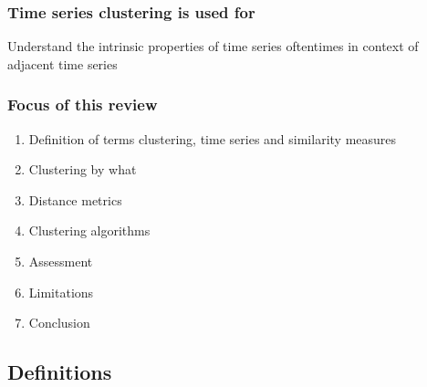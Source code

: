 \documentclass[11pt]{article}
\begin{document}
\subsubsection*{Time series clustering is used for}
\label{sec:org438f867}
Understand the intrinsic properties of time series oftentimes in context of adjacent time series
\subsubsection*{Focus of this review}
\label{sec:orgac5424e}
\begin{enumerate}
\item Definition  of terms clustering, time series and similarity measures
\item Clustering by what
\item Distance metrics
\item Clustering algorithms
\item Assessment
\item Limitations
\item Conclusion
\end{enumerate}

\subsection*{Definitions}
\label{sec:orgb0cbac9}
\end{document}
